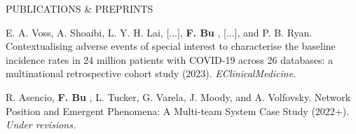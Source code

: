 \documentclass{resume} %
\newcommand{\myName}[1]{
	\textbf{#1}
}
\begin{document}
\begin{rSection}{PUBLICATIONS \& PREPRINTS}
\smallskip

E. A. Voss, A. Shoaibi, L. Y. H. Lai,  [...], \myName{F. Bu}, [...], and P. B. Ryan. Contextualising adverse events of special interest to characterise the baseline incidence rates in 24 million patients with COVID-19 across 26 databases: a multinational retrospective cohort study (2023). \emph{EClinicalMedicine}. 


\smallskip

R. Asencio, \myName{F. Bu}, L. Tucker, G. Varela, J. Moody, and A. Volfovsky. 
Network Position and Emergent Phenomena: A Multi-team System Case Study (2022+). \emph{Under revisions.}


\end{rSection}




%

\end{document}
